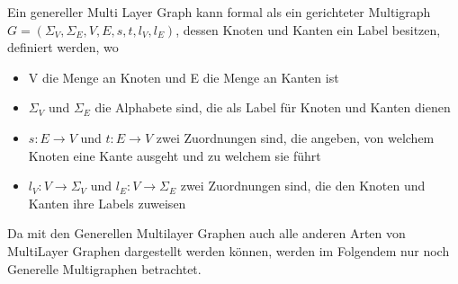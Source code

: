 Ein genereller Multi Layer Graph kann formal als ein gerichteter Multigraph\cite{article} $G = (\Sigma_{V}, \Sigma_{E}, V, E, s, t, l_{V}, l_{E})$, dessen Knoten und Kanten ein Label besitzen, definiert werden, wo

\begin{itemize}
  \item V die Menge an Knoten und E die Menge an Kanten ist
  \item $\Sigma_{V}$ und $\Sigma_{E}$ die Alphabete sind, die als Label für Knoten und Kanten dienen
  \item $s: E \rightarrow V$ und $t: E \rightarrow V$ zwei Zuordnungen sind, die angeben, von welchem Knoten eine Kante ausgeht und zu welchem sie führt
  \item $l_{V}: V \rightarrow \Sigma_{V}$ und $l_{E}: V \rightarrow \Sigma_{E}$ zwei Zuordnungen sind, die den Knoten und Kanten ihre Labels zuweisen
\end{itemize}

Da mit den Generellen Multilayer Graphen auch alle anderen Arten von MultiLayer Graphen dargestellt werden können, werden im Folgendem nur noch Generelle Multigraphen betrachtet.
